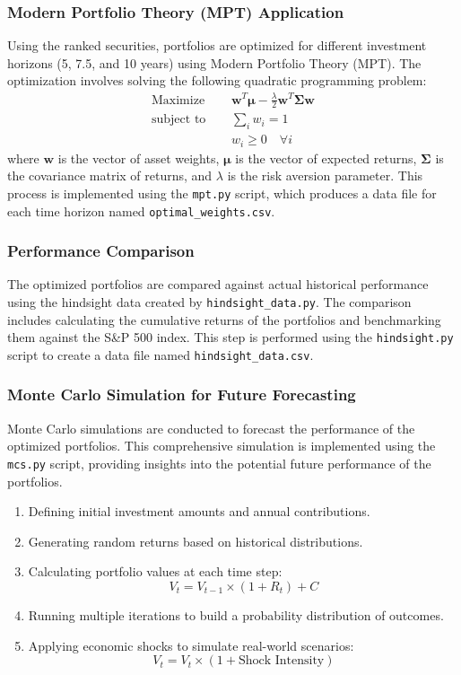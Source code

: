 \subsubsection{Modern Portfolio Theory (MPT) Application}
Using the ranked securities, portfolios are optimized for different investment horizons (5, 7.5, and 10 years) using Modern Portfolio Theory (MPT). The optimization involves solving the following quadratic programming problem:
\begin{align}
    \text{Maximize } & \quad \mathbf{w}^T \mathbf{\mu} - \frac{\lambda}{2} \mathbf{w}^T \mathbf{\Sigma} \mathbf{w} \\
    \text{subject to} & \quad \sum_{i} w_i = 1 \\
    & \quad w_i \geq 0 \quad \forall i
\end{align}
where \(\mathbf{w}\) is the vector of asset weights, \(\mathbf{\mu}\) is the vector of expected returns, \(\mathbf{\Sigma}\) is the covariance matrix of returns, and \(\lambda\) is the risk aversion parameter. This process is implemented using the \texttt{mpt.py} script, which produces a data file for each time horizon named \texttt{optimal\_weights.csv}.

\subsubsection{Performance Comparison}
The optimized portfolios are compared against actual historical performance using the hindsight data created by \texttt{hindsight\_data.py}. The comparison includes calculating the cumulative returns of the portfolios and benchmarking them against the S\&P 500 index. This step is performed using the \texttt{hindsight.py} script to create a data file named \texttt{hindsight\_data.csv}.

\subsubsection{Monte Carlo Simulation for Future Forecasting}
Monte Carlo simulations are conducted to forecast the performance of the optimized portfolios. This comprehensive simulation is implemented using the \texttt{mcs.py} script, providing insights into the potential future performance of the portfolios.
\begin{enumerate}
    \item Defining initial investment amounts and annual contributions.
    \item Generating random returns based on historical distributions.
    \item Calculating portfolio values at each time step:
    \begin{equation}
        V_t = V_{t-1} \times (1 + R_t) + C
    \end{equation}
    \item Running multiple iterations to build a probability distribution of outcomes.
    \item Applying economic shocks to simulate real-world scenarios:
    \begin{equation}
        V_t = V_t \times (1 + \text{Shock Intensity})
    \end{equation}
\end{enumerate}

\newpage
